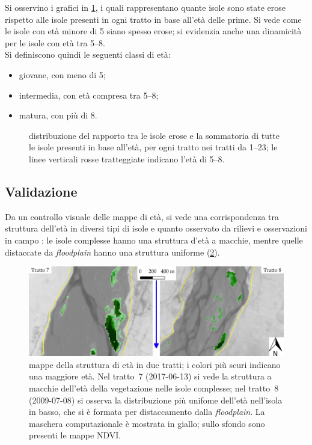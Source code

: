 Si osservino i grafici in \cref{graph:distrib-rapp-eros-eta}, i quali rappresentano quante isole sono state erose rispetto alle isole presenti in ogni tratto in base all'età delle prime.
Si vede come le isole con età minore di \SI{5}{\anni} siano spesso erose; si evidenzia anche una dinamicità per le isole con età tra \SIrange[range-phrase={ e }]{5}{8}{\anni}. 
\\
Si definiscono quindi le seguenti classi di età:
%
\begin{itemize}
	\item giovane, con meno di \SI{5}{\anni};
	\item intermedia, con età compresa tra \SIrange[range-phrase={ e }]{5}{8}{\anni};
	\item matura, con più di \SI{8}{\anni}.
\end{itemize}
%
\begin{figure}
	\centering
	
	\caption[distribuzione del rapporto tra isole erose e la somma delle isole presenti per ogni età rilevata]{distribuzione del rapporto tra le isole erose e la sommatoria di tutte le isole presenti in base all'età, per ogni tratto nei tratti da \numrange[range-phrase = { a }, mode = text]{1}{23}; le linee verticali rosse tratteggiate indicano l'età di \SIrange[range-phrase = { e }]{5}{8}{\anni}.}
	\label{graph:distrib-rapp-eros-eta}
\end{figure}

\subsection{Validazione}
Da un controllo visuale delle mappe di età, si vede una corrispondenza tra struttura dell'età in diversi tipi di isole e quanto osservato da rilievi e osservazioni in campo : le isole complesse hanno una struttura d'età a macchie, mentre quelle distaccate da \emph{floodplain} hanno una struttura uniforme (\cref{fig:struttura-eta}).
%
\begin{figure}
	\centering
	\includegraphics[width = \textwidth]{files/struttura_eta.jpeg}
	\caption[mappe della struttura di età in due tratti]{mappe della struttura di età in due tratti; i colori più scuri indicano una maggiore età.
		Nel tratto~7 (2017-06-13) si vede la struttura a macchie dell'età della vegetazione nelle isole complesse;
		nel tratto~8 (2009-07-08) si osserva la distribuzione più unifome dell'età nell'isola in basso, che si è formata per distaccamento dalla \emph{floodplain}.
		La maschera computazionale è mostrata in giallo; sullo sfondo sono presenti le mappe NDVI.}
	\label{fig:struttura-eta}
\end{figure}
%

